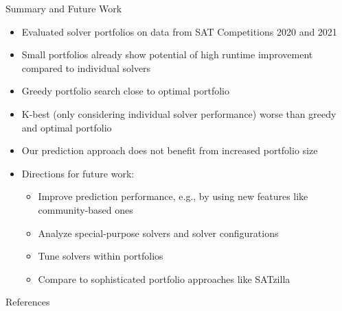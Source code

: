 \documentclass[en]{sdqbeamer}
\begin{document}
\begin{frame}[t]{Summary and Future Work}
	\begin{itemize}
		\item Evaluated solver portfolios on data from SAT Competitions 2020 and 2021
		\pause
		\item Small portfolios already show potential of high runtime improvement compared to individual solvers
		\pause
		\item Greedy portfolio search close to optimal portfolio
		\pause
		\item K-best (only considering individual solver performance) worse than greedy and optimal portfolio
		\pause
		\item Our prediction approach does not benefit from increased portfolio size
		\pause
		\vspace{\baselineskip}
		\item Directions for future work:
		\begin{itemize}
			\item Improve prediction performance, e.g., by using new features like community-based ones~\cite{Ansotegui:2019:CommunityStructure, Li:2021:HCS}
			\pause
			\item Analyze special-purpose solvers and solver configurations
			\pause
			\item Tune solvers within portfolios~\cite{Kadioglu:2010:ISAC}
			\pause
			\item Compare to sophisticated portfolio approaches like SATzilla~\cite{xu2008satzilla, xu2012satzilla2012}
		\end{itemize}
	\end{itemize}
\end{frame}

\appendix
\beginbackup %

\begin{frame}[t, allowframebreaks]{References}
	\printbibliography
\end{frame}

\backupend
\end{document}
